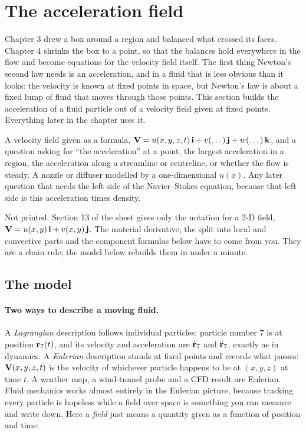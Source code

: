 \section{The acceleration field}
\label{sec:acceleration}

Chapter 3 drew a box around a region and balanced what crossed its faces. Chapter 4 shrinks the box to a point, so that the balances hold everywhere in the flow and become equations for the velocity field itself. The first thing Newton's second law needs is an acceleration, and in a fluid that is less obvious than it looks: the velocity is known at fixed points in space, but Newton's law is about a fixed lump of fluid that moves through those points. This section builds the acceleration of a fluid particle out of a velocity field given at fixed points. Everything later in the chapter uses it.

\begin{recognise}
A velocity field given as a formula, $\mathbf{V} = u(x,y,z,t)\,\mathbf{i} + v(\dots)\,\mathbf{j} + w(\dots)\,\mathbf{k}$, and a question asking for ``the acceleration'' at a point, the largest acceleration in a region, the acceleration along a streamline or centreline, or whether the flow is steady. A nozzle or diffuser modelled by a one-dimensional $u(x)$. Any later question that needs the left side of the Navier--Stokes equation, because that left side is this acceleration times density.
\end{recognise}

\begin{onsheet}
Not printed. Section 13 of the sheet gives only the notation for a 2-D field, $\mathbf{V} = u(x,y)\,\mathbf{i} + v(x,y)\,\mathbf{j}$. The material derivative, the split into local and convective parts and the component formulas below have to come from you. They are a chain rule; the model below rebuilds them in under a minute.
\end{onsheet}

\subsection*{The model}

\paragraph{Two ways to describe a moving fluid.} A \emph{Lagrangian} description follows individual particles: particle number $7$ is at position $\mathbf{r}_7(t)$, and its velocity and acceleration are $\dot{\mathbf{r}}_7$ and $\ddot{\mathbf{r}}_7$, exactly as in dynamics. A \emph{Eulerian} description stands at fixed points and records what passes: $\mathbf{V}(x,y,z,t)$ is the velocity of whichever particle happens to be at $(x,y,z)$ at time $t$. A weather map, a wind-tunnel probe and a CFD result are Eulerian. Fluid mechanics works almost entirely in the Eulerian picture, because tracking every particle is hopeless while a field over space is something you can measure and write down. Here a \emph{field} just means a quantity given as a function of position and time.

